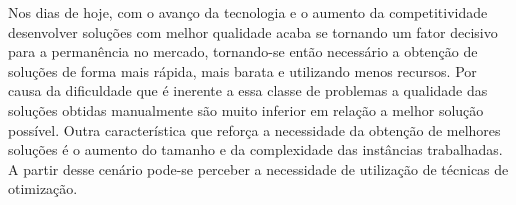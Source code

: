 	
 
  
Nos dias de hoje, com o avanço da tecnologia e o aumento da competitividade
desenvolver soluções com melhor qualidade acaba se tornando um fator decisivo
para a permanência no mercado, tornando-se então necessário a obtenção de
soluções de forma mais rápida, mais barata e utilizando menos recursos. Por
causa da dificuldade que é inerente a essa classe de problemas a qualidade das
soluções obtidas manualmente são muito inferior em relação a melhor solução
possível. Outra característica que reforça a necessidade da obtenção de melhores soluções é o
aumento do tamanho e da complexidade das instâncias trabalhadas. A partir desse
cenário pode-se perceber a necessidade de utilização de técnicas de otimização.

  


